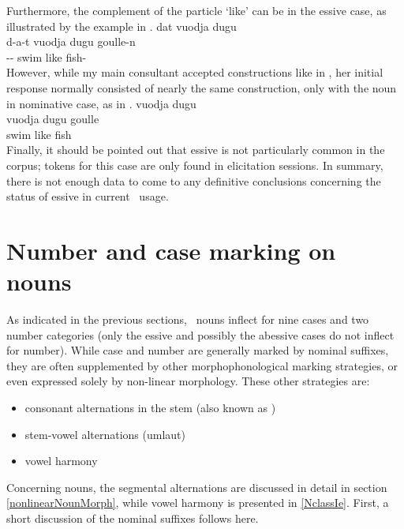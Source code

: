 Furthermore, the complement of the particle  ‘like’ can be in the essive case, as illustrated by the example in . 
\ea\label{ess3}
\glll	dat vuodja dugu \\
	d-a-t vuodja dugu goulle-n\\
	-- swim\BS{} like fish-\\\nopagebreak
{} 
\z
However, while my main consultant accepted constructions like in , her initial response normally consisted of nearly the same construction, only with the noun in nominative case, as in . 
\ea\label{ess4}
\glll	vuodja dugu \\
	vuodja dugu goulle\\
	swim\BS{} like fish\BS{}\\\nopagebreak
{} 
\z
Finally, it should be pointed out that essive is not particularly common in the corpus; tokens for this case are only found in elicitation sessions. In summary, there is not enough data to come to any definitive conclusions concerning the status of essive in current \PS\ usage. %


\section{Number and case marking on nouns}\label{NumCaseNouns}
As indicated in the previous sections, \PS\ nouns inflect for nine cases and two number categories (only the essive and possibly the abessive cases do not inflect for number). While case and number are generally marked by nominal suffixes, they are often supplemented by other morphophonological marking strategies, or even expressed solely by non-linear morphology. These other strategies are: 
\begin{itemize}
\item{consonant alternations in the stem (also known as )}
\item{stem-vowel alternations (umlaut)}
\item{vowel harmony}
\end{itemize} %
Concerning nouns, the segmental alternations are discussed in detail in section \ref{nonlinearNounMorph}, while vowel harmony is presented in \ref{NclassIe}. First, a short discussion of the nominal suffixes follows here.


